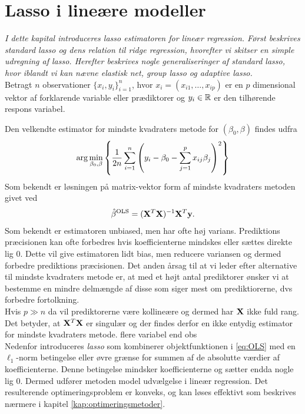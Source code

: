 \chapter{Lasso i lineære modeller}
\textit{I dette kapital introduceres lasso estimatoren for lineær regression. 
Først beskrives standard lasso og dens relation til ridge regression, hvorefter vi skitser en simple udregning af lasso.
Herefter beskrives nogle generaliseringer af standard lasso, hvor iblandt vi kan nævne elastisk net, group lasso og adaptive lasso.} \\[4mm]
%
Betragt \(n\) observationer \(\{x_i, y_i\}_{i=1}^n \), hvor $x_i=(x_{i1}, \ldots, x_{ip})$ er en $p$ dimensional vektor af forklarende variable eller prædiktorer og $y_i \in \mathbb{R}$ er den tilhørende respons variabel.

Den velkendte estimator for mindste kvadraters metode for $(\beta_0, \beta)$ findes udfra
\begin{align}
\arg \min_{\beta_0, \beta} \cbr{\frac{1}{2n} \sum_{i=1}^n \del{y_i - \beta_0 - \sum_{j=1}^p x_{ij} \beta_j}^2} \label{eq:OLS}
\end{align}
Som bekendt er løsningen på matrix-vektor form af mindste kvadraters metoden givet ved
\begin{align*}
\hat{\beta}^{\text{OLS}} = (\mathbf{X}^T \mathbf{X})^{-1} \mathbf{X}^T \mathbf{y}.
\end{align*}
Som bekendt er estimatoren unbiased, men har ofte høj varians. 
Prediktions præcisionen kan ofte forbedres hvis koefficienterne mindskes eller sættes direkte lig 0.
Dette vil give estimatoren lidt bias, men reducere variansen og dermed forbedre prediktions præcisionen.
Det anden årsag til at vi leder efter alternative til mindste kvadraters metode er, at med et højt antal prediktorer ønsker vi at bestemme en mindre delmængde af disse som siger mest om prediktiorerne, dvs forbedre fortolkning.\\[4mm]

Hvis \(p \gg n\) da vil prediktorerne være kollineære og dermed har \(\mathbf{X}\) ikke fuld rang.
Det betyder, at $\mathbf{X}^T \mathbf{X}$ er singulær og der findes derfor en ikke entydig estimator for mindste kvadraters metode.
flere variabel end obs \\[4mm]
%
Nedenfor introduceres \textit{lasso} som kombinerer objektfunktionen i \eqref{eq:OLS} med en $\ell_1$-norm betingelse eller øvre grænse for summen af de absolutte værdier af koefficienterne.
Denne betingelse mindsker koefficienterne og sætter endda nogle lig 0. 
Dermed udfører metoden model udvælgelse i lineær regression.
Det resulterende optimeringsproblem er konveks, og kan løses effektivt som beskrives nærmere i kapitel \ref{kap:optimeringsmetoder}.



